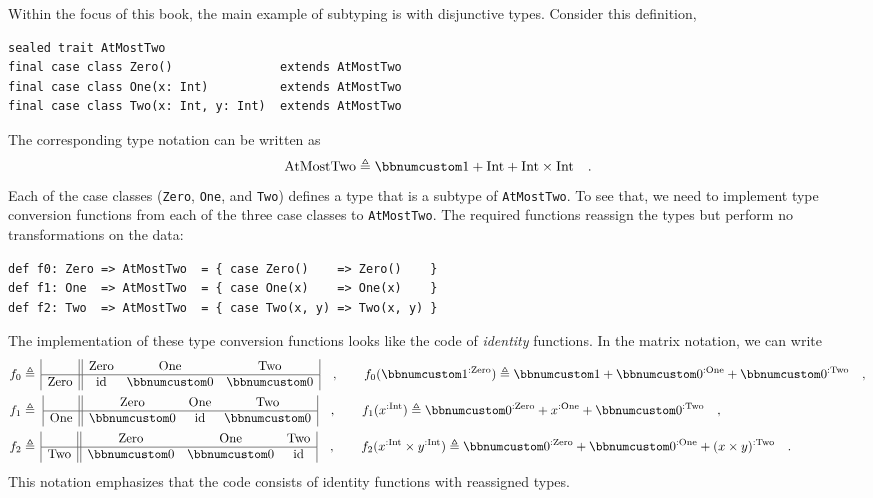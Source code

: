 Within the focus of this book, the main example of subtyping is with
disjunctive types. Consider this definition,
\begin{lstlisting}
sealed trait AtMostTwo
final case class Zero()               extends AtMostTwo
final case class One(x: Int)          extends AtMostTwo
final case class Two(x: Int, y: Int)  extends AtMostTwo
\end{lstlisting}
The corresponding type notation can be written as
\[
\text{AtMostTwo}\triangleq\bbnum 1+\text{Int}+\text{Int}\times\text{Int}\quad.
\]
Each of the case classes (\lstinline!Zero!, \lstinline!One!, and
\lstinline!Two!) defines a type that is a subtype of \lstinline!AtMostTwo!.
To see that, we need to implement type conversion functions from each
of the three case classes to \lstinline!AtMostTwo!. The required
functions reassign the types but perform no transformations on the
data:
\begin{lstlisting}
def f0: Zero => AtMostTwo  = { case Zero()    => Zero()    }
def f1: One  => AtMostTwo  = { case One(x)    => One(x)    }
def f2: Two  => AtMostTwo  = { case Two(x, y) => Two(x, y) }
\end{lstlisting}
The implementation of these type conversion functions looks like the
code of \emph{identity} functions. In the matrix notation, we can
write
\begin{align*}
f_{0} & \triangleq\,\begin{array}{|c||ccc|}
 & \text{Zero} & \text{One} & \text{Two}\\
\hline \text{Zero} & \text{id} & \bbnum 0 & \bbnum 0
\end{array}\quad,\quad\quad f_{0}(\bbnum 1^{:\text{Zero}})\triangleq\bbnum 1+\bbnum 0^{:\text{One}}+\bbnum 0^{:\text{Two}}\quad,\\
f_{1} & \triangleq\,\,\begin{array}{|c||ccc|}
 & \text{Zero} & \text{One} & \text{Two}\\
\hline \text{One} & \bbnum 0 & \text{id} & \bbnum 0
\end{array}\quad,\quad\quad f_{1}(x^{:\text{Int}})\triangleq\bbnum 0^{:\text{Zero}}+x^{:\text{One}}+\bbnum 0^{:\text{Two}}\quad,\\
f_{2} & \triangleq\,\begin{array}{|c||ccc|}
 & \text{Zero} & \text{One} & \text{Two}\\
\hline \text{Two} & \bbnum 0 & \bbnum 0 & \text{id}
\end{array}\quad,\quad\quad f_{2}(x^{:\text{Int}}\times y^{:\text{Int}})\triangleq\bbnum 0^{:\text{Zero}}+\bbnum 0^{:\text{One}}+(x\times y)^{:\text{Two}}\quad.
\end{align*}
This notation emphasizes that the code consists of identity functions
with reassigned types.

